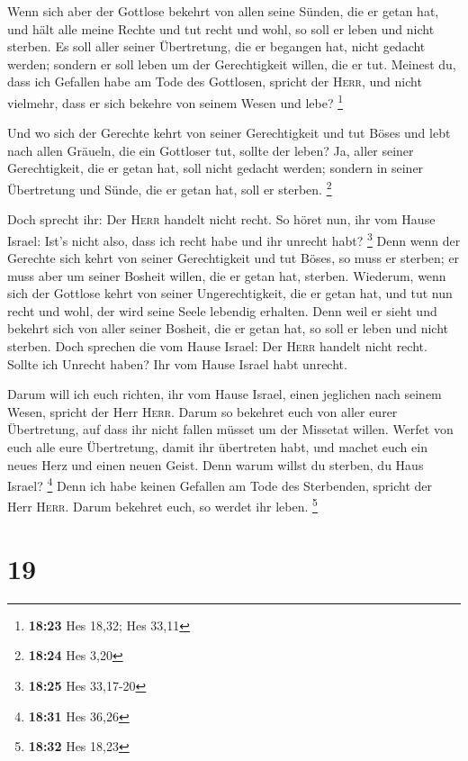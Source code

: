  Wenn sich aber der Gottlose bekehrt von allen seine
Sünden, die er getan hat, und hält alle meine Rechte und tut recht und
wohl, so soll er leben und nicht sterben.  Es soll aller
seiner Übertretung, die er begangen hat, nicht gedacht werden; sondern
er soll leben um der Gerechtigkeit willen, die er tut. 
Meinest du, dass ich Gefallen habe am Tode des Gottlosen, spricht der
\textsc{Herr}, und nicht vielmehr, dass er sich bekehre von seinem Wesen
und lebe? \footnote{\textbf{18:23} Hes 18,32; Hes 33,11}

 Und wo sich der Gerechte kehrt von seiner Gerechtigkeit
und tut Böses und lebt nach allen Gräueln, die ein Gottloser tut, sollte
der leben? Ja, aller seiner Gerechtigkeit, die er getan hat, soll nicht
gedacht werden; sondern in seiner Übertretung und Sünde, die er getan
hat, soll er sterben. \footnote{\textbf{18:24} Hes 3,20}

 Doch sprecht ihr: Der \textsc{Herr} handelt nicht recht.
So höret nun, ihr vom Hause Israel: Ist's nicht also, dass ich recht
habe und ihr unrecht habt? \footnote{\textbf{18:25} Hes 33,17-20}
 Denn wenn der Gerechte sich kehrt von seiner
Gerechtigkeit und tut Böses, so muss er sterben; er muss aber um seiner
Bosheit willen, die er getan hat, sterben.  Wiederum,
wenn sich der Gottlose kehrt von seiner Ungerechtigkeit, die er getan
hat, und tut nun recht und wohl, der wird seine Seele lebendig erhalten.
 Denn weil er sieht und bekehrt sich von aller seiner
Bosheit, die er getan hat, so soll er leben und nicht sterben.
 Doch sprechen die vom Hause Israel: Der \textsc{Herr}
handelt nicht recht. Sollte ich Unrecht haben? Ihr vom Hause Israel habt
unrecht.

 Darum will ich euch richten, ihr vom Hause Israel, einen
jeglichen nach seinem Wesen, spricht der Herr \textsc{Herr}. Darum so
bekehret euch von aller eurer Übertretung, auf dass ihr nicht fallen
müsset um der Missetat willen.  Werfet von euch alle eure
Übertretung, damit ihr übertreten habt, und machet euch ein neues Herz
und einen neuen Geist. Denn warum willst du sterben, du Haus Israel?
\footnote{\textbf{18:31} Hes 36,26}  Denn ich habe keinen
Gefallen am Tode des Sterbenden, spricht der Herr \textsc{Herr}. Darum
bekehret euch, so werdet ihr leben. \footnote{\textbf{18:32} Hes 18,23}

\hypertarget{section-6}{%
\section{19}\label{section-6}}


